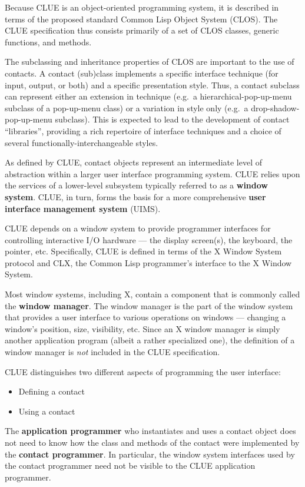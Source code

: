 Because CLUE is an object-oriented programming system, it is described
in terms of the proposed standard
Common Lisp Object System (CLOS)\cite{clos}. The CLUE
specification thus
consists primarily of a set of CLOS classes, generic functions, and methods. 


The subclassing and inheritance properties of CLOS are
important to the use of contacts. A contact (sub)class implements a
specific interface technique (for input, output, or both) and a specific
presentation style. Thus, a contact subclass
can represent either an extension in technique (e.g.\ a hierarchical-pop-up-menu
subclass of a pop-up-menu class) or a variation in style only (e.g.\ a
drop-shadow-pop-up-menu subclass). This is expected to lead to the development
of contact ``libraries'', providing a rich repertoire of interface
techniques and a choice of several functionally-interchangeable styles.


As defined by CLUE, contact objects represent an intermediate level of
abstraction within a larger user interface programming system.
CLUE relies upon the services of a lower-level subsystem typically referred to as
a {\bf window system}. CLUE, in turn, forms the basis for a
more comprehensive {\bf user interface management system}
(UIMS).

CLUE depends on a window system to provide programmer interfaces for controlling
interactive I/O hardware  --- the display screen(s), the keyboard, the
pointer, etc.  Specifically, CLUE is defined in
terms of the X Window System protocol\cite{x-protocol} and CLX, the
Common Lisp programmer's interface to the X Window System\cite{clx}. 

Most window systems, including X, contain a component that is commonly called the 
{\bf window manager}. The window manager is the
part of the window system that provides a user interface to various operations on
windows --- changing a window's position, size, visibility, etc.
Since an X window manager is simply another application program (albeit a rather
specialized one), the
definition of a window manager is {\em not} included in the CLUE specification.

CLUE distinguishes two different aspects of programming the user
interface:

\begin{itemize}
\item Defining a contact
\item Using a contact
\end{itemize} 
The {\bf application programmer} who
instantiates and uses a contact object does not need to know 
how the class and methods of the contact were implemented 
by the 
{\bf contact programmer}. 
In particular, the
window system interfaces used by the contact programmer need not be
visible to the CLUE application programmer. 

